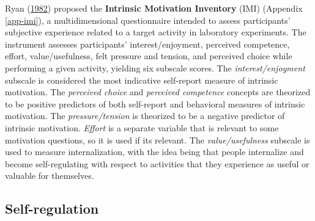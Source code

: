 \documentclass[letterpaper, nobind]{templates/ociamthesis}
\begin{document}
Ryan (\protect\hyperlink{ref-ryan1982control}{1982}) proposed the \textbf{Intrinsic Motivation Inventory} (IMI)
(Appendix \ref{app-imi}), a multidimensional questionnaire intended to
assess participants' subjective experience related to a target activity
in laboratory experiments. The instrument assesses participants'
interest/enjoyment, perceived competence, effort, value/usefulness, felt
pressure and tension, and perceived choice while performing a given
activity, yielding six subscale scores. The \emph{interest/enjoyment}
subscale is considered the most indicative self-report measure of
intrinsic motivation. The \emph{perceived choice} and \emph{perceived competence}
concepts are theorized to be positive predictors of both self-report and
behavioral measures of intrinsic motivation. The \emph{pressure/tension} is
theorized to be a negative predictor of intrinsic motivation. \emph{Effort}
is a separate variable that is relevant to some motivation questions, so
it is used if its relevant. The \emph{value/usefulness} subscale is used to
measure internalization, with the idea being that people internalize and
become self-regulating with respect to activities that they experience
as useful or valuable for themselves.

\hypertarget{sec-bg-learn-self-regulation}{%
\subsection{Self-regulation}\label{sec-bg-learn-self-regulation}}
\end{document}
